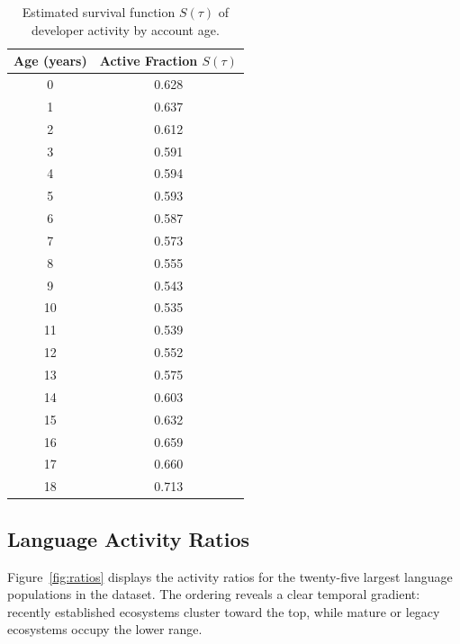 \documentclass[12pt,a4paper]{article}
\begin{document}
\begin{table}[h]
\centering
\begin{tabular}{cc}
\toprule
Age (years) & Active Fraction $S(\tau)$ \\
\midrule
0  & 0.628 \\
1  & 0.637 \\
2  & 0.612 \\
3  & 0.591 \\
4  & 0.594 \\
5  & 0.593 \\
6  & 0.587 \\
7  & 0.573 \\
8  & 0.555 \\
9  & 0.543 \\
10 & 0.535 \\
11 & 0.539 \\
12 & 0.552 \\
13 & 0.575 \\
14 & 0.603 \\
15 & 0.632 \\
16 & 0.659 \\
17 & 0.660 \\
18 & 0.713 \\
\bottomrule
\end{tabular}
\caption{Estimated survival function $S(\tau)$ of developer activity by account age.}
\label{tab:survival}
\end{table}

\subsection{Language Activity Ratios}

Figure~\ref{fig:ratios} displays the activity ratios for the twenty-five largest language populations in the dataset. The ordering reveals a clear temporal gradient: recently established ecosystems cluster toward the top, while mature or legacy ecosystems occupy the lower range.
\end{document}
